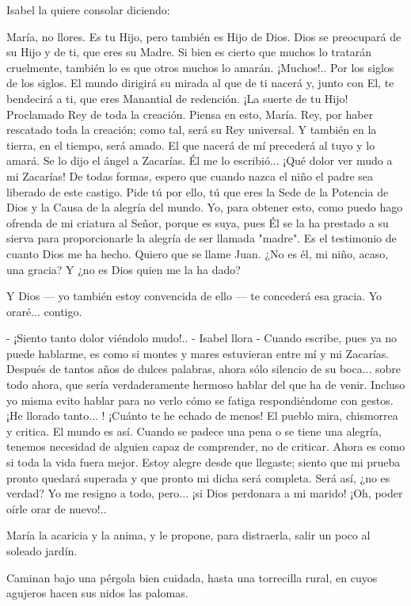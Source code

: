 \documentclass[12pt]{book} %
\begin{document}
Isabel la quiere consolar diciendo: 

María, no llores. Es tu Hijo, pero también es Hijo de Dios. Dios se preocupará de su Hijo y de ti, que eres su Madre. Si bien es cierto que muchos lo tratarán cruelmente, también lo es que otros muchos lo amarán. ¡Muchos!.. Por los siglos de los siglos. El mundo dirigirá su mirada al que de ti nacerá y, junto con El, te bendecirá a ti, que eres Manantial de redención. ¡La suerte de tu Hijo! Proclamado Rey de toda la creación. Piensa en esto, María. Rey, por haber rescatado toda la creación; como tal, será su Rey universal. Y también en la tierra, en el tiempo, será amado. El que nacerá de mí precederá al tuyo y lo amará. Se lo dijo el ángel a Zacarías. Él me lo escribió... ¡Qué dolor ver mudo a mi Zacarías! De todas formas, espero que cuando nazca el niño el padre sea liberado de este castigo. Pide tú por ello, tú que eres la Sede de la Potencia de Dios y la Causa de la alegría del mundo. Yo, para obtener esto, como puedo hago ofrenda de mi criatura al Señor, porque es suya, pues Él se la ha prestado a su sierva para proporcionarle la alegría de ser llamada "madre". Es el testimonio de cuanto Dios me ha hecho. Quiero que se llame Juan. ¿No es él, mi niño, acaso, una gracia? Y ¿no es Dios quien me la ha dado? 

Y Dios — yo también estoy convencida de ello — te concederá esa gracia. Yo oraré... contigo. 

- ¡Siento tanto dolor viéndolo mudo!.. - Isabel llora - Cuando escribe, pues ya no puede hablarme, es como si montes y mares estuvieran entre mí y mi Zacarías. Después de tantos años de dulces palabras, ahora sólo silencio de su boca... sobre todo ahora, que sería verdaderamente hermoso hablar del que ha de venir. Incluso yo misma evito hablar para no verlo cómo se fatiga respondiéndome con gestos. ¡He llorado tanto... ! ¡Cuánto te he echado de menos! El pueblo mira, chismorrea y critica. El mundo es así. Cuando se padece una pena o se tiene una alegría, tenemos necesidad de alguien capaz de comprender, no de criticar. Ahora es como si toda la vida fuera mejor. Estoy alegre desde que llegaste; siento que mi prueba pronto quedará superada y que pronto mi dicha será completa. Será así, ¿no es verdad? Yo me resigno a todo, pero... ¡si Dios perdonara a mi marido! ¡Oh, poder oírle orar de nuevo!.. 

María la acaricia y la anima, y le propone, para distraerla, salir un poco al soleado jardín. 

Caminan bajo una pérgola bien cuidada, hasta una torrecilla rural, en cuyos agujeros hacen sus nidos las palomas. 
\end{document}
